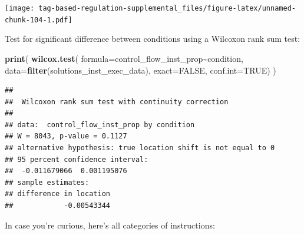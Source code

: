 \documentclass[
]{book}
\newenvironment{Shaded}{\begin{snugshade}}{\end{snugshade}}
\newcommand{\DataTypeTok}[1]{\textcolor[rgb]{0.13,0.29,0.53}{#1}}
\newcommand{\KeywordTok}[1]{\textcolor[rgb]{0.13,0.29,0.53}{\textbf{#1}}}
\newcommand{\NormalTok}[1]{#1}
\newcommand{\OperatorTok}[1]{\textcolor[rgb]{0.81,0.36,0.00}{\textbf{#1}}}
\newcommand{\OtherTok}[1]{\textcolor[rgb]{0.56,0.35,0.01}{#1}}
\begin{document}
\texttt{[image: tag-based-regulation-supplemental\_files/figure-latex/unnamed-chunk-104-1.pdf]}

Test for significant difference between conditions using a Wilcoxon rank sum test:

\begin{Shaded}
\begin{Highlighting}[]
\KeywordTok{print}\NormalTok{(}
  \KeywordTok{wilcox.test}\NormalTok{(}
    \DataTypeTok{formula=}\NormalTok{control\_flow\_inst\_prop}\OperatorTok{\textasciitilde{}}\NormalTok{condition,}
    \DataTypeTok{data=}\KeywordTok{filter}\NormalTok{(solutions\_inst\_exec\_data),}
    \DataTypeTok{exact=}\OtherTok{FALSE}\NormalTok{,}
    \DataTypeTok{conf.int=}\OtherTok{TRUE}\NormalTok{)}
\NormalTok{)}
\end{Highlighting}
\end{Shaded}

\begin{verbatim}
## 
##  Wilcoxon rank sum test with continuity correction
## 
## data:  control_flow_inst_prop by condition
## W = 8043, p-value = 0.1127
## alternative hypothesis: true location shift is not equal to 0
## 95 percent confidence interval:
##  -0.011679066  0.001195076
## sample estimates:
## difference in location 
##            -0.00543344
\end{verbatim}

In case you're curious, here's all categories of instructions:
\end{document}
